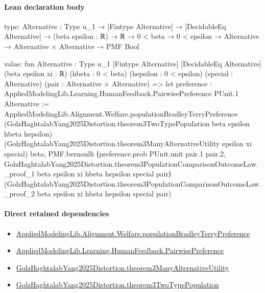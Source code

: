 \documentclass[10pt]{article}
\begin{document}
\paragraph{Lean declaration body}
\begin{ReviewVerbatim}
type:
{Alternative : Type u_1} →
  [Fintype Alternative] →
    [DecidableEq Alternative] →
      (beta epsilon : ℝ) → ℝ → 0 < beta → 0 < epsilon → Alternative → Alternative × Alternative → PMF Bool

value:
fun {Alternative : Type u_1} [Fintype Alternative] [DecidableEq Alternative] (beta epsilon xi : ℝ) (hbeta : 0 < beta)
    (hepsilon : 0 < epsilon) (special : Alternative) (pair : Alternative × Alternative) =>
  let preference : AppliedModelingLib.Learning.HumanFeedback.PairwisePreference PUnit.{1} Alternative :=
    AppliedModelingLib.Alignment.Welfare.populationBradleyTerryPreference
      (GolzHaghtalabYang2025Distortion.theorem3TwoTypePopulation beta epsilon hbeta hepsilon)
      (GolzHaghtalabYang2025Distortion.theorem3ManyAlternativeUtility epsilon xi special) beta;
  PMF.bernoulli
    ⟨preference.prob PUnit.unit pair.1 pair.2,
      GolzHaghtalabYang2025Distortion.theorem3PopulationComparisonOutcomeLaw._proof_1 beta epsilon xi hbeta hepsilon
        special pair⟩
    (GolzHaghtalabYang2025Distortion.theorem3PopulationComparisonOutcomeLaw._proof_2 beta epsilon xi hbeta hepsilon
      special pair)
\end{ReviewVerbatim}

\paragraph{Direct retained dependencies}
\begin{itemize}\raggedright
\item \hyperlink{library-prerequisite-cf06d15d7f8b7c31}{Applied\allowbreak{}Modeling\allowbreak{}Lib.\allowbreak{}Alignment.\allowbreak{}Welfare.\allowbreak{}population\allowbreak{}Bradley\allowbreak{}Terry\allowbreak{}Preference}
\item \hyperlink{library-prerequisite-7e2db20cf087d9ba}{Applied\allowbreak{}Modeling\allowbreak{}Lib.\allowbreak{}Learning.\allowbreak{}Human\allowbreak{}Feedback.\allowbreak{}Pairwise\allowbreak{}Preference}
\item \hyperlink{governing-declaration-bfef2d422eb25497}{Golz\allowbreak{}Haghtalab\allowbreak{}Yang2025\allowbreak{}Distortion.\allowbreak{}theorem3\allowbreak{}Many\allowbreak{}Alternative\allowbreak{}Utility}
\item \hyperlink{governing-declaration-5256b014ca2f6f1b}{Golz\allowbreak{}Haghtalab\allowbreak{}Yang2025\allowbreak{}Distortion.\allowbreak{}theorem3\allowbreak{}Two\allowbreak{}Type\allowbreak{}Population}
\end{itemize}
\hypertarget{governing-declaration-94724c60280865f4}{}
\end{document}
